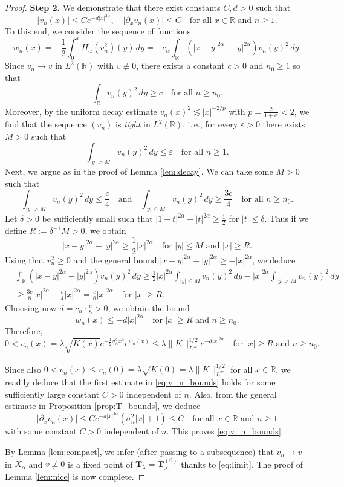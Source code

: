 \documentclass[10pt,a4paper]{amsart}
\newcommand{\R}{\mathbb{R}}
\newcommand{\Ts}{\mathbf{T}}
\newcommand{\be}{\begin{equation}}
\newcommand{\ee}{\end{equation}}
\newcommand{\eps}{\varepsilon}
\newcommand{\pt}{\partial}
\renewcommand{\geq}{\geqslant}
\renewcommand{\leq}{\leqslant}
\begin{document}
\begin{proof}
 \medskip
 \textbf{Step 2.} We demonstrate that there exist constants $C, d > 0$ such that
 \be \label{eq:v_n_bounds}
 |v_n(x)| \leq  C e^{-d |x|^{2 \alpha}}, \quad |\pt_x v_n(x)| \leq C \quad \mbox{for all $x \in \R$ and $n \geq 1$}.
 \ee
To this end, we consider the sequence of functions
$$
w_n(x) = -\frac{1}{2} \int_0^x H_\alpha(v_n^2)(y) \, dy = -c_\alpha \int_\R (|x-y|^{2 \alpha} - |y|^{2 \alpha}) v_n(y)^2 \, dy .
$$
Since $v_n \to v$ in $L^2(\R)$ with $v \not \equiv 0$, there exists a constant $c>0$ and $n_0 \geq 1$ so that
$$
\int_{\R} v_n(y)^2 \, dy \geq c \quad \mbox{for all $n \geq n_0$}.
$$
Moreover, by the uniform decay estimate $v_n(x)^2 \lesssim |x|^{-2/p}$ with $p=\frac{2}{1+\alpha} < 2$, we find that the sequence $(v_n)$ is {\em tight} in $L^2(\R)$, i.\,e., for every $\eps > 0$ there exists $M > 0$ such that
$$
\int_{|y| > M} v_n(y)^2 \, dy \leq \eps \quad \mbox{for all $n \geq 1$}.
$$ 
Next, we argue as in the proof of Lemma \ref{lem:decay}. We can take some $M>0$ such that
$$
\int_{|y| > M} v_n(y)^2 \, dy \leq \frac{c}{4} \quad \mbox{and} \quad \int_{|y| \leq M} v_n(y)^2 \, dy \geq \frac{3 c}{4} \quad \mbox{for all $n \geq n_0$}.
$$
Let $\delta > 0$ be sufficiently small such that $|1-t|^{2 \alpha} - |t|^{2 \alpha} \geq \frac{1}{2}$ for $|t| \leq \delta$. Thus if we define $R:=\delta^{-1} M > 0$, we obtain
$$
|x-y|^{2 \alpha} - |y|^{2 \alpha} \geq \frac{1}{2} |x|^{2 \alpha} \quad \mbox{for $|y| \leq M$ and $|x| \geq R$}.
$$
Using that $v_n^2 \geq 0$ and the general bound $|x-y|^{2\alpha} -|y|^{2 \alpha} \geq -|x|^{2 \alpha}$, we deduce
\begin{align*}
& \int_\R (|x-y|^{2 \alpha}- |y|^{2 \alpha}) v_n(y)^2 \, dy \geq \frac{1}{2} |x|^{2 \alpha} \int_{|y| \leq M} v_n(y)^2 \, dy - |x|^{2 \alpha} \int_{|y| > M} v_n(y)^2 \, dy \\
& \geq \frac{3 c}{8} |x|^{2 \alpha} - \frac{c}{4} |x|^{2 \alpha} = \frac{c}{8} |x|^{2 \alpha} \quad \mbox{for $|x| \geq R$}.
\end{align*}
Choosing now $d = c_\alpha \cdot \frac{c}{8} >0$, we obtain the bound
$$
w_n(x) \leq -d |x|^{2 \alpha} \quad \mbox{for $|x| \geq R$ and $n \geq n_0$}.
$$
Therefore,
$$
0 < v_n(x) = \lambda \sqrt{K(x)} e^{-\frac{1}{2} \sigma_n^2 x^2} e^{w_n(x)}  \leq \lambda \| K \|_{L^\infty}^{1/2}  e^{-d |x|^{2 \alpha}} \quad \mbox{for $|x| \geq R$ and $n \geq n_0$}.
$$

Since also $0 < v_n(x) \leq v_n(0) = \lambda \sqrt{K(0)} = \lambda \| K \|_{L^\infty}^{1/2}$ for all $x \in \R$, we readily deduce that the first estimate in \eqref{eq:v_n_bounds} holds for some sufficiently large constant $C>0$ independent of $n$. Also, from the general estimate in Proposition \ref{prop:T_bounds}, we deduce
$$
|\pt_x v_n(x)| \leq C e^{-d|x|^{2 \alpha}} (\sigma_n^2 |x| + 1) \leq C \quad \mbox{for all $x \in \R$ and $n \geq 1$}
$$
with some constant $C >0$ independent of $n$. This proves \eqref{eq:v_n_bounds}.

By Lemma \ref{lem:compact}, we infer (after passing to a subsequence) that $v_n \to v$ in $X_\alpha$ and $v \not \equiv 0$ is a fixed point of $\Ts_\lambda=\Ts_{\lambda}^{(0)}$ thanks to \eqref{eq:limit}. The proof of Lemma \ref{lem:nice} is now complete.
\end{proof}
\end{document}
